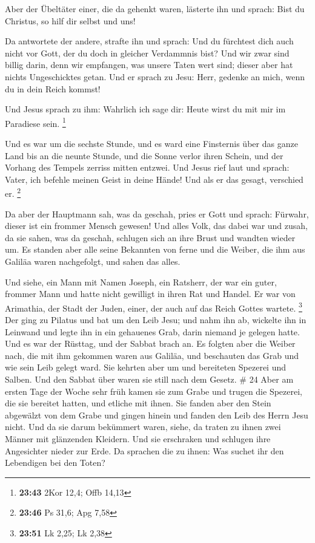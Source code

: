  Aber der Übeltäter einer, die da gehenkt waren, lästerte
ihn und sprach: Bist du Christus, so hilf dir selbst und uns!

 Da antwortete der andere, strafte ihn und sprach: Und du
fürchtest dich auch nicht vor Gott, der du doch in gleicher Verdammnis
bist?  Und wir zwar sind billig darin, denn wir empfangen,
was unsere Taten wert sind; dieser aber hat nichts Ungeschicktes getan.
 Und er sprach zu Jesu: Herr, gedenke an mich, wenn du in
dein Reich kommst!

 Und Jesus sprach zu ihm: Wahrlich ich sage dir: Heute
wirst du mit mir im Paradiese sein. \footnote{\textbf{23:43} 2Kor 12,4;
  Offb 14,13}

 Und es war um die sechste Stunde, und es ward eine
Finsternis über das ganze Land bis an die neunte Stunde, 
und die Sonne verlor ihren Schein, und der Vorhang des Tempels zerriss
mitten entzwei.  Und Jesus rief laut und sprach: Vater, ich
befehle meinen Geist in deine Hände! Und als er das gesagt, verschied
er. \footnote{\textbf{23:46} Ps 31,6; Apg 7,58}

 Da aber der Hauptmann sah, was da geschah, pries er Gott
und sprach: Fürwahr, dieser ist ein frommer Mensch gewesen!
 Und alles Volk, das dabei war und zusah, da sie sahen, was
da geschah, schlugen sich an ihre Brust und wandten wieder um.
 Es standen aber alle seine Bekannten von ferne und die
Weiber, die ihm aus Galiläa waren nachgefolgt, und sahen das alles.

 Und siehe, ein Mann mit Namen Joseph, ein Ratsherr, der
war ein guter, frommer Mann  und hatte nicht gewilligt in
ihren Rat und Handel. Er war von Arimathia, der Stadt der Juden, einer,
der auch auf das Reich Gottes wartete. \footnote{\textbf{23:51} Lk 2,25;
  Lk 2,38}  Der ging zu Pilatus und bat um den Leib Jesu;
 und nahm ihn ab, wickelte ihn in Leinwand und legte ihn in
ein gehauenes Grab, darin niemand je gelegen hatte.  Und es
war der Rüsttag, und der Sabbat brach an.  Es folgten aber
die Weiber nach, die mit ihm gekommen waren aus Galiläa, und beschauten
das Grab und wie sein Leib gelegt ward.  Sie kehrten aber
um und bereiteten Spezerei und Salben. Und den Sabbat über waren sie
still nach dem Gesetz. \# 24  Aber am ersten Tage der Woche
sehr früh kamen sie zum Grabe und trugen die Spezerei, die sie bereitet
hatten, und etliche mit ihnen.  Sie fanden aber den Stein
abgewälzt von dem Grabe  und gingen hinein und fanden den
Leib des Herrn Jesu nicht.  Und da sie darum bekümmert
waren, siehe, da traten zu ihnen zwei Männer mit glänzenden Kleidern.
 Und sie erschraken und schlugen ihre Angesichter nieder zur
Erde. Da sprachen die zu ihnen: Was suchet ihr den Lebendigen bei den
Toten?

